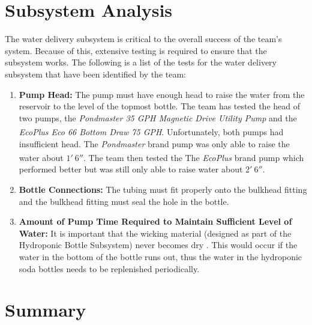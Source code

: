 \documentclass[12pt]{article}
\let\supscr=\textsuperscript
\begin{document}
\section{Subsystem Analysis}


The water delivery subsystem is critical to the overall success of the team's system. Because of
this, extensive testing is required to ensure that the subsystem works. The following is a list of
the tests for the water delivery subsystem that have been identified by the team:

\begin{enumerate}

    \item \textbf{Pump Head:} The pump must have enough head to raise the water from the
        reservoir to the level of the topmost bottle. The team has tested the head of two pumps, the
        \textit{Pondmaster 35 GPH Magnetic Drive Utility Pump} and the
        \textit{EcoPlus\supscr{\textregistered} Eco 66 Bottom Draw 75 GPH}. Unfortunately, both
        pumps had insufficient head. The \textit{Pondmaster} brand pump was only able to raise the
        water about $1'\ 6''$. The team then tested the The \textit{EcoPlus\supscr{\textregistered}}
        brand pump which performed better but was still only able to raise water about $2'\ 6''$.

    \item \textbf{Bottle Connections:} The tubing must fit properly onto the bulkhead fitting
        and the bulkhead fitting must seal the hole in the bottle.

    \item \textbf{Amount of Pump Time Required to Maintain Sufficient Level of Water:} It is
        important that the wicking material (designed as part of the Hydroponic Bottle Subsystem)
        never becomes dry \cite{kaiser-and-erns}. This would occur if the water in the bottom of the
        bottle runs out, thus the water in the hydroponic soda bottles needs to be replenished
        periodically.

\end{enumerate}

\section{Summary}
\end{document}

